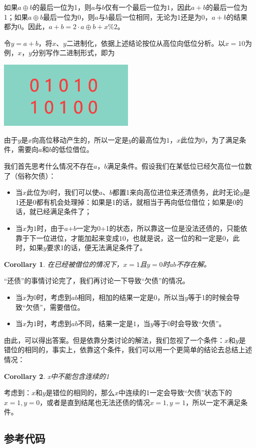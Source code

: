 \documentclass[UTF8]{ctexart}
\newtheorem{corollary}{Corollary}[section]
\begin{document}
	如果$a\oplus b$的最后一位为1，则$a$与$b$仅有一个最后一位为$1$，因此$a+b$的最后一位为1；如果$a\oplus b$最后一位为0，则$a$与$b$最后一位相同，无论为1还是为0，$a+b$的结果都为0。因此，$a+b=2\cdot a\oplus b + x\%2$。
	
	令$y=a+b$，将$x$、$y$二进制化，依据上述结论按位从高位向低位分析。以$x=10$为例，$x$，$y$分别写作二进制形式，即为{
	
	
	\centering\includegraphics[width=0.5\textwidth]{problem4picture1}

	}
	由于$y$是$x$向高位移动产生的，所以一定是$y$的最高位为$1$，$x$此位为$0$，为了满足条件，需要向$a$和$b$的低位借位。
	
	我们首先思考什么情况不存在$a$，$b$满足条件。假设我们在某低位已经欠高位一位数了（俗称欠债）：
	\begin{itemize}
		\item 当$x$此位为$0$时，我们可以使$a$、$b$都置1来向高位进位来还清债务，此时无论$y$是1还是0都有机会处理掉：如果是1的话，就相当于再向低位借位；如果是0的话，就已经满足条件了；
		\item 当$x$为$1$时，由于$a$+$b$一定为0+1的状态，所以靠这一位是没法还债的，只能依靠于下一位进位，才能加起来变成$10$，也就是说，这一位的和一定是$0$，此时，如果$y$要求1的话，便无法满足条件了。
	\end{itemize}
	\begin{corollary} 
		在已经被借位的情况下，$x=1$且$y=0$时$ab$不存在解。
		\label{cor-1}
	\end{corollary}
	“还债”的事情讨论完了，我们再讨论一下导致“欠债”的情况。
	\begin{itemize}
		\item 当$x$为$0$时，考虑到$ab$相同，相加的结果一定是$0$，所以当$y$等于1的时候会导致“欠债”，需要借位。
		\item 当$x$为$1$时，考虑到$ab$不同，结果一定是$1$，当$y$等于0时会导致“欠债”。
	\end{itemize}
	由此，可以得出答案。但是依靠分类讨论的解法，我们忽视了一个条件：$x$和$y$是错位的相同的，事实上，依靠这个条件，我们可以用一个更简单的结论去总结上述情况：
	
	\begin{corollary} 
		x中不能包含连续的1
		\label{cor-1}
	\end{corollary}
	
	考虑到：$x$和$y$是错位的相同的，那么$x$中连续的1一定会导致“欠债”状态下的$x=1,y=0$，或者是直到结尾也无法还债的情况$x=1,y=1$，所以一定不满足条件。
	
	\subsection{参考代码}
	
\end{document}
